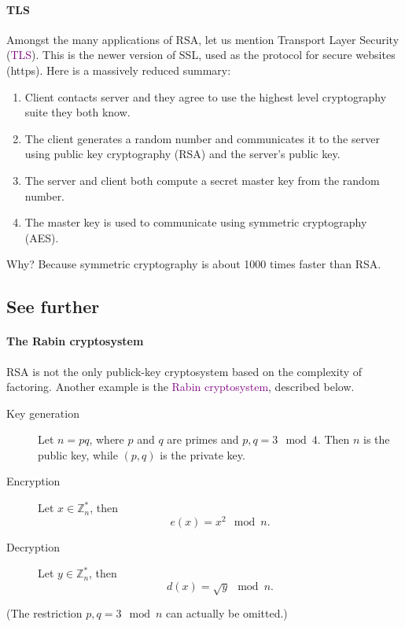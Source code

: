 \documentclass[a4paper, 11pt, openany]{book}
\numberwithin{equation}{section}
\theoremstyle{plain}
\theoremstyle{definition}
\newcommand{\Z}{\mathbb{Z}}
\newcommand{\Define}[1]{\textcolor{purple}{#1}}
\begin{document}
\paragraph{TLS}
Amongst the many applications of RSA, let us mention Transport Layer Security (\Define{TLS}). This is the newer version of SSL, used as the protocol for secure websites (https). Here is a massively reduced summary: 
\begin{enumerate}
	\item Client contacts server and they agree to use the highest level cryptography suite they both know.
	
	\item The client generates a random number and communicates it to the server using public key cryptography (RSA) and the server's public key.
	
	\item The server and client both compute a secret master key from the random number.
	
	\item The master key is used to communicate using symmetric cryptography (AES).
\end{enumerate}
Why? Because symmetric cryptography is about 1000 times faster than RSA.




\subsection{See further}

\paragraph{The Rabin cryptosystem}
RSA is not the only publick-key cryptosystem based on the complexity of factoring. Another example is the \Define{Rabin cryptosystem}, described below.
\begin{description}
    \item[Key generation] Let $n = pq$, where $p$ and $q$ are primes and $p,q = 3 \mod 4$. Then $n$ is the public key, while $(p,q)$ is the private key.
    
    \item[Encryption] Let $x \in \Z_n^*$, then
    \[
        e(x) = x^2 \mod n.
    \]
    
    \item[Decryption] Let $y \in \Z_n^*$, then
    \[
        d(x) = \sqrt{y} \mod n.
    \]
\end{description}
(The restriction $p,q = 3 \mod n$ can actually be omitted.)
\end{document}
